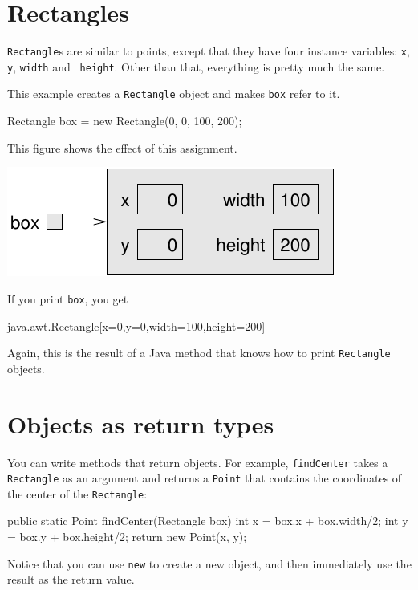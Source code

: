 \section{Rectangles}

{\tt Rectangle}s are similar to points, except that they have four
instance variables: {\tt x}, {\tt y}, {\tt width} and {\tt
height}.  Other than that, everything is pretty much the same.

This example
creates a {\tt Rectangle} object and makes {\tt box} refer to it.

\begin{code}
    Rectangle box = new Rectangle(0, 0, 100, 200);
\end{code}
%
This figure shows the effect of this assignment.


\includegraphics{figs/rectangle.pdf}

If you print {\tt box}, you get

\begin{code}
java.awt.Rectangle[x=0,y=0,width=100,height=200]
\end{code}
%
Again, this is the result of a Java method that knows how
to print {\tt Rectangle} objects.


\section{Objects as return types}

You can write methods that return objects.  For example,
{\tt findCenter} takes a {\tt Rectangle} as an argument and
returns a {\tt Point} that contains the coordinates of the
center of the {\tt Rectangle}:

\begin{code}
  public static Point findCenter(Rectangle box) {
    int x = box.x + box.width/2;
    int y = box.y + box.height/2;
    return new Point(x, y);
  }
\end{code}
%
Notice that you can use {\tt new} to create a new object,
and then immediately use the result as the return value.


